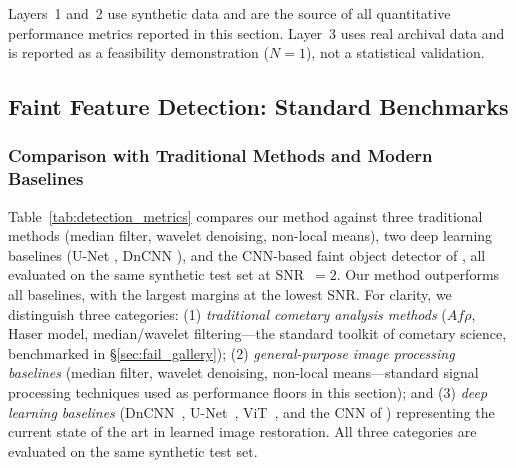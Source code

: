 \documentclass[usenatbib]{mnras}
\begin{document}
Layers~1 and~2 use synthetic data and are the source of all quantitative performance metrics reported in this section. Layer~3 uses real archival data and is reported as a feasibility demonstration ($N=1$), not a statistical validation.

\subsection{Faint Feature Detection: Standard Benchmarks}

\subsubsection{Comparison with Traditional Methods and Modern Baselines}

Table~\ref{tab:detection_metrics} compares our method against three traditional methods (median filter, wavelet denoising, non-local means), two deep learning baselines (U-Net \citealt{ronneberger15}, DnCNN \citealt{zhang17}), and the CNN-based faint object detector of \citet{jiang23}, all evaluated on the same synthetic test set at SNR~$=2$. Our method outperforms all baselines, with the largest margins at the lowest SNR. For clarity, we distinguish three categories: (1) \textit{traditional cometary analysis methods} ($Af\rho$, Haser model, median/wavelet filtering---the standard toolkit of cometary science, benchmarked in \S\ref{sec:fail_gallery}); (2) \textit{general-purpose image processing baselines} (median filter, wavelet denoising, non-local means---standard signal processing techniques used as performance floors in this section); and (3) \textit{deep learning baselines} (DnCNN~\citealt{zhang17}, U-Net~\citealt{ronneberger15}, ViT~\citealt{dosovitskiy21}, and the CNN of \citet{jiang23}) representing the current state of the art in learned image restoration. All three categories are evaluated on the same synthetic test set.
\end{document}
